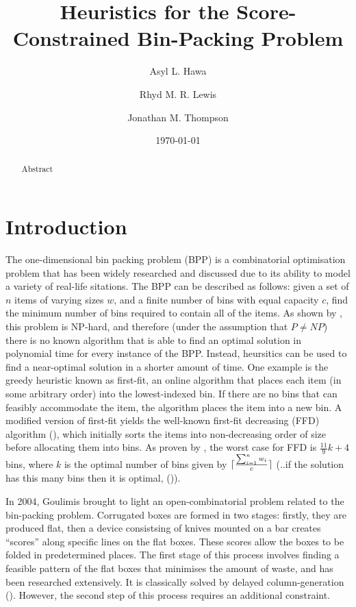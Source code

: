 \documentclass[oribibl]{llncs}
\title{Heuristics for the Score-Constrained Bin-Packing Problem}
\author{Asyl L. Hawa \and Rhyd M. R. Lewis \and Jonathan M. Thompson}
\institute{School of Mathematics, Cardiff University, Senghennydd Road, Cardiff, UK, CF24 4AG}
\date{\today}
\begin{document}
\maketitle

\begin{abstract}
	Abstract
\end{abstract}

\section{Introduction}
\label{sec:intro}

The one-dimensional bin packing problem (BPP) is a combinatorial optimisation problem that has been widely researched and discussed due to its ability to model a variety of real-life sitations.
The BPP can be described as follows: given a set of $n$ items of varying sizes $w$, and a finite number of bins with equal capacity $c$, find the minimum number of bins required to contain all of the items. As shown by \cite{garey1979}, this problem is NP-hard, and therefore (under the assumption that $P \neq NP$) there is no known algorithm that is able to find an optimal solution in polynomial time for every instance of the BPP. Instead, heursitics can be used to find a near-optimal solution in a shorter amount of time. One example is the greedy heuristic known as first-fit, an online algorithm that places each item (in some arbitrary order) into the lowest-indexed bin. If there are no bins that can feasibly accommodate the item, the algorithm places the item into a new bin. A modified version of first-fit yields the well-known first-fit decreasing (FFD) algorithm (\citealp{eilon1971}), which initially sorts the items into non-decreasing order of size before allocating them into bins. As proven by \cite{dosa2007}, the worst case for FFD is $\frac{11}{9}k + 4$ bins, where $k$ is the optimal number of bins given by $\lceil\frac{\sum_{i=1}^{n} w_{i}}{c}\rceil$ (..if the solution has this many bins then it is optimal, (\citealp{korf2002})).

In 2004, Goulimis brought to light an open-combinatorial problem related to the bin-packing problem. Corrugated boxes are formed in two stages: firstly, they are produced flat, then a device consistsing of knives mounted on a bar creates ``scores'' along specific lines on the flat boxes. These scores allow the boxes to be folded in predetermined places. The first stage of this process involves finding a feasible pattern of the flat boxes that minimises the amount of waste, and has been researched extensively. It is classically solved by delayed column-generation (\citealp{gilmore1961, gilmore1963}). However, the second step of this process requires an additional constraint.
\end{document}
